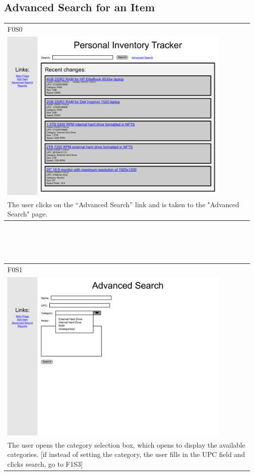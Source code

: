 \documentclass{article}
\begin{document}
\subsection{Advanced Search for an Item}
\begin{tabular}{ p{4.5in} }
F0S0\\
\includegraphics[keepaspectratio, width=4.5in]{advancedSearchF0S0.pdf} \\
The user clicks on the ``Advanced Search'' link and is taken to the "Advanced Search" page.
\end{tabular}\\
~\\
~\\
\begin{tabular}{ p{4.5in} }
F0S1\\
\includegraphics[keepaspectratio, width=4.5in]{advancedSearchF0S1.pdf} \\
The user opens the category selection box, which opens to display the available categories. [if instead of setting the category, the user fills in the UPC field and clicks search, go to F1S3]
\end{tabular}\\
\end{document}
